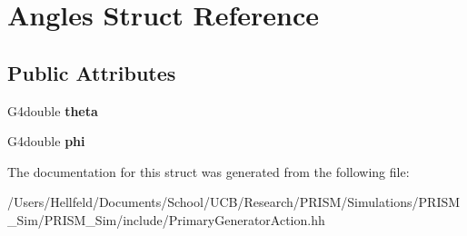 \hypertarget{struct_angles}{}\section{Angles Struct Reference}
\label{struct_angles}
\subsection*{Public Attributes}
\begin{DoxyCompactItemize}
\item 
\hypertarget{struct_angles_aa462c67b8885678826e948ac0c4df7c9}{}\label{struct_angles_aa462c67b8885678826e948ac0c4df7c9} 
G4double {\bfseries theta}
\item 
\hypertarget{struct_angles_acb157a5857a39850063b0e6dfc03c509}{}\label{struct_angles_acb157a5857a39850063b0e6dfc03c509} 
G4double {\bfseries phi}
\end{DoxyCompactItemize}


The documentation for this struct was generated from the following file\+:\begin{DoxyCompactItemize}
\item 
/\+Users/\+Hellfeld/\+Documents/\+School/\+U\+C\+B/\+Research/\+P\+R\+I\+S\+M/\+Simulations/\+P\+R\+I\+S\+M\+\_\+\+Sim/\+P\+R\+I\+S\+M\+\_\+\+Sim/include/Primary\+Generator\+Action.\+hh\end{DoxyCompactItemize}
